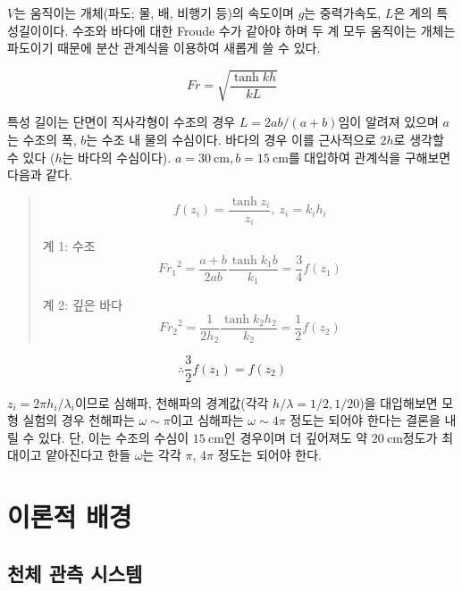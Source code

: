 $V$는 움직이는 개체(파도; 물, 배, 비행기 등)의 속도이며 $g$는 중력가속도, $L$은 계의 특성길이이다. 수조와 바다에 대한 Froude 수가 같아야 하며 두 계 모두 움직이는 개체는 파도이기 때문에 분산 관계식을 이용하여 새롭게 쓸 수 있다.

\begin{equation}
    Fr = \sqrt{\frac{\tanh{kh}}{kL}}
\end{equation}

특성 길이는 단면이 직사각형이 수조의 경우 $L = {2ab}/{(a+b)}$임이 알려져 있으며 $a$는 수조의 폭, $b$는 수조 내 물의 수심이다. 바다의 경우 이를 근사적으로 $2h$로 생각할 수 있다 ($h$는 바다의 수심이다). $a=30\mathrm{~cm}, b=15\mathrm{~cm}$를 대입하여 관계식을 구해보면 다음과 같다.

\begin{quote}
    \[f(z_i) = \frac{\tanh{z_i}}{z_i},~  z_i = k_i h_i\]

    \begin{multicols}{2}

    계 1: 수조
    \[{Fr_1}^{2} = \frac{a+b}{2ab} \frac{\tanh{k_1 b}}{k_1} = \frac{3}{4} f(z_{1})\]

    \columnbreak
    
    계 2: 깊은 바다
    \[{Fr_2}^{2} = \frac{1}{2h_2} \frac{\tanh{k_2 h_2}}{k_2} = \frac{1}{2} f(z_{2})\]
    \end{multicols}

\end{quote}

\begin{equation}
    \therefore \frac{3}{2}f(z_1 ) = f(z_2 )
\end{equation}

$z_i = 2\pi h_i/\lambda_i$이므로 심해파, 천해파의 경계값(각각 $h/\lambda = 1/2, 1/20$)을 대입해보면 모형 실험의 경우 천해파는 $\omega \sim \pi$이고 심해파는 $\omega \sim 4\pi$ 정도는 되어야 한다는 결론을 내릴 수 있다. 단, 이는 수조의 수심이 $15\mathrm{~cm}$인 경우이며 더 깊어져도 약 $20\mathrm{~cm}$정도가 최대이고 얕아진다고 한들 $\omega$는 각각 $\pi$, $4\pi$ 정도는 되어야 한다.


\section{이론적 배경}

\subsection{천체 관측 시스템}

